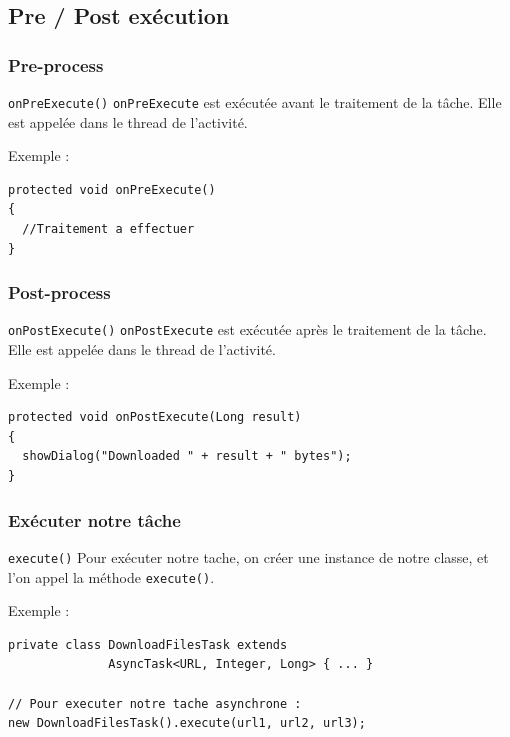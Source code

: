 \documentclass{beamer}
\begin{document}
\subsection{Pre / Post exécution}
\begin{frame}[fragile]
\frametitle{Pre-process}

\begin{block}{\verb!onPreExecute()!}
\verb!onPreExecute! est exécutée avant le traitement de la tâche. Elle est appelée dans le thread de l'activité.
\end{block}

\begin{exampleblock}{Exemple :}
\begin{lstlisting}
protected void onPreExecute()
{
  //Traitement a effectuer
}
\end{lstlisting}
\end{exampleblock}
\end{frame}
\begin{frame}[fragile]
\frametitle{Post-process}

\begin{block}{\verb!onPostExecute()!}
\verb!onPostExecute! est exécutée après le traitement de la tâche. Elle est appelée dans le thread de l'activité.
\end{block}

\begin{exampleblock}{Exemple :}
\begin{lstlisting}
protected void onPostExecute(Long result)
{
  showDialog("Downloaded " + result + " bytes");
}
\end{lstlisting}
\end{exampleblock}
\end{frame}

\begin{frame}[fragile]
\frametitle{Exécuter notre tâche}

\begin{block}{\verb!execute()!}
Pour exécuter notre tache, on créer une instance de notre classe, et l'on appel la méthode \verb!execute()!.
\end{block}
\begin{exampleblock}{Exemple :}
\begin{lstlisting}
private class DownloadFilesTask extends
              AsyncTask<URL, Integer, Long> { ... }

// Pour executer notre tache asynchrone :
new DownloadFilesTask().execute(url1, url2, url3);
\end{lstlisting}
\end{exampleblock}

\end{frame}
\end{document}
